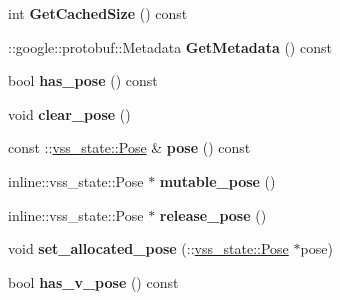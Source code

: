 \begin{DoxyCompactItemize}
\item 
int {\bfseries Get\+Cached\+Size} () const \hypertarget{classvss__state_1_1Robot__State_ada89e91697c3773ab009c765b2884734}{}\label{classvss__state_1_1Robot__State_ada89e91697c3773ab009c765b2884734}

\item 
\+::google\+::protobuf\+::\+Metadata {\bfseries Get\+Metadata} () const \hypertarget{classvss__state_1_1Robot__State_afb2668f8b861828a30ac978ab416e900}{}\label{classvss__state_1_1Robot__State_afb2668f8b861828a30ac978ab416e900}

\item 
bool {\bfseries has\+\_\+pose} () const \hypertarget{classvss__state_1_1Robot__State_a16f5802d6a727b0c4c98472010c12460}{}\label{classvss__state_1_1Robot__State_a16f5802d6a727b0c4c98472010c12460}

\item 
void {\bfseries clear\+\_\+pose} ()\hypertarget{classvss__state_1_1Robot__State_a33d40f6cc351a111c3bae3e095566564}{}\label{classvss__state_1_1Robot__State_a33d40f6cc351a111c3bae3e095566564}

\item 
const \+::\hyperlink{classvss__state_1_1Pose}{vss\+\_\+state\+::\+Pose} \& {\bfseries pose} () const \hypertarget{classvss__state_1_1Robot__State_a0c7dee60f0d9b34d6708f7912e666e68}{}\label{classvss__state_1_1Robot__State_a0c7dee60f0d9b34d6708f7912e666e68}

\item 
inline\+::vss\+\_\+state\+::\+Pose $\ast$ {\bfseries mutable\+\_\+pose} ()\hypertarget{classvss__state_1_1Robot__State_a08d3b0444895130052a1805120013941}{}\label{classvss__state_1_1Robot__State_a08d3b0444895130052a1805120013941}

\item 
inline\+::vss\+\_\+state\+::\+Pose $\ast$ {\bfseries release\+\_\+pose} ()\hypertarget{classvss__state_1_1Robot__State_ad644f3a9823f0cf600305257b0608b46}{}\label{classvss__state_1_1Robot__State_ad644f3a9823f0cf600305257b0608b46}

\item 
void {\bfseries set\+\_\+allocated\+\_\+pose} (\+::\hyperlink{classvss__state_1_1Pose}{vss\+\_\+state\+::\+Pose} $\ast$pose)\hypertarget{classvss__state_1_1Robot__State_af8564fc0f0e930796b9ba74fbf02b057}{}\label{classvss__state_1_1Robot__State_af8564fc0f0e930796b9ba74fbf02b057}

\item 
bool {\bfseries has\+\_\+v\+\_\+pose} () const \hypertarget{classvss__state_1_1Robot__State_a99a2138f4352bfac49f101ef1a3e2aa3}{}\label{classvss__state_1_1Robot__State_a99a2138f4352bfac49f101ef1a3e2aa3}


\end{DoxyCompactItemize}
